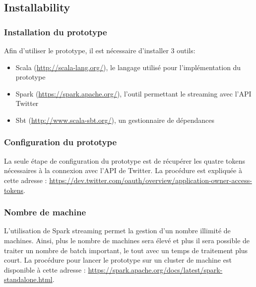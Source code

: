   \subsection{Installability}
    \subsubsection{Installation du prototype}
      Afin d'utiliser le prototype, il est nécessaire d'installer 3 outils:
      \begin{itemize}
        \item Scala (\url{http://scala-lang.org/}), le langage utilisé pour l'implémentation du prototype
        \item Spark (\url{https://spark.apache.org/}), l'outil permettant le streaming avec l'API Twitter
        \item Sbt (\url{http://www.scala-sbt.org/}), un gestionnaire de dépendances
      \end{itemize}

    \subsubsection{Configuration du prototype}
      La seule étape de configuration du prototype est de récupérer les quatre tokens nécessaires à la connexion avec l'API de Twitter. La procédure est expliquée à cette adresse : \url{https://dev.twitter.com/oauth/overview/application-owner-access-tokens}.

    \subsubsection{Nombre de machine}
      L'utilisation de Spark streaming permet la gestion d'un nombre illimité de machines. Ainsi, plus le nombre de machines sera élevé et plus il sera possible de traiter un nombre de batch important, le tout avec un temps de traitement plus court. La procédure pour lancer le prototype sur un cluster de machine est disponible à cette adresse : \url{https://spark.apache.org/docs/latest/spark-standalone.html}.
